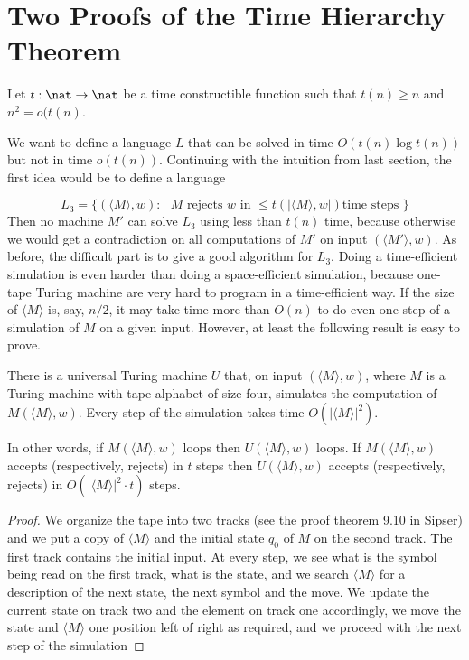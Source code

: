 \documentclass[11pt]{article}
\begin{document}
\section{Two Proofs of the Time Hierarchy Theorem}

Let $t:\nat \to \nat$ be a time constructible function such that $t(n)\geq n$
and $n^2 = o(t(n)$.

We want to define a language $L$ that can be solved
in time  $O(t(n)\log t(n))$ but not  in time $o(t(n))$. Continuing
with the intuition from last section, the first idea would be to
define a language

\[ L_3 = \{ ( \langle M \rangle, w) : \mbox{ $M$ rejects $w$ in $\leq t(|\langle M \rangle, w|)$
time steps } \} \]
Then no machine $M'$ can solve $L_3$ using less than $t(n)$ time, because
otherwise we would get a contradiction on all computations of $M'$ on input
$( \langle M' \rangle, w)$. As before, the difficult part is to give
a good algorithm for $L_3$. Doing a time-efficient simulation is even
harder than doing a space-efficient simulation, because one-tape Turing
machine are very hard to program in a time-efficient way. If the size
of $\langle M \rangle$ is, say, $n/2$, it may take time more than $O(n)$ to do
even one step of a simulation of $M$ on a given input. However, at least
the following result is easy to prove.

\begin{lemma}\label{lm:univ}
There is a universal Turing machine $U$ that, on input $( \langle M \rangle, w)$,
where $M$ is a Turing machine with tape alphabet of size four,
simulates the computation of $M ( \langle M \rangle, w)$. Every step of the
simulation takes time $O(|\langle M \rangle| ^2)$.

In other words, if $M ( \langle M \rangle, w)$ loops then $U ( \langle M \rangle, w)$
loops. If $M ( \langle M \rangle, w)$ accepts (respectively, rejects)
in $t$ steps then $U ( \langle M \rangle, w)$ accepts (respectively, rejects)
in $O(|\langle M \rangle |^2 \cdot t)$ steps.
\end{lemma}

\begin{proof}
We organize the tape into two tracks (see the proof theorem 9.10 in 
Sipser) and we put a copy of $\langle M \rangle$ and the initial state
$q_0$ of $M$ on the second track. The first track contains the initial input.
At every step, we see what is the symbol being read on the first track,
what is the state, and we search $\langle M\rangle$ for a description of
the next state, the next symbol and the move. We update the current state on track two
and the element on track one accordingly, we move the state and $\langle M \rangle$ one
position left of right as required, and we proceed with the next step of the
simulation  
\end{proof}
\end{document}
